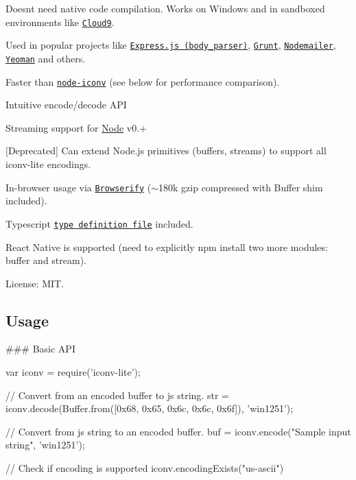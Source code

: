 
\begin{DoxyItemize}
\item Doesn\textquotesingle{}t need native code compilation. Works on Windows and in sandboxed environments like \href{http://c9.io}{\tt Cloud9}.
\item Used in popular projects like \href{https://github.com/expressjs/body-parser}{\tt Express.\+js (body\+\_\+parser)}, \href{http://gruntjs.com/}{\tt Grunt}, \href{http://www.nodemailer.com/}{\tt Nodemailer}, \href{http://yeoman.io/}{\tt Yeoman} and others.
\item Faster than \href{https://github.com/bnoordhuis/node-iconv}{\tt node-\/iconv} (see below for performance comparison).
\item Intuitive encode/decode A\+PI
\item Streaming support for \mbox{\hyperlink{classNode}{Node}} v0.+
\item \mbox{[}Deprecated\mbox{]} Can extend Node.\+js primitives (buffers, streams) to support all iconv-\/lite encodings.
\item In-\/browser usage via \href{https://github.com/substack/node-browserify}{\tt Browserify} ($\sim$180k gzip compressed with Buffer shim included).
\item Typescript \href{https://github.com/ashtuchkin/iconv-lite/blob/master/lib/index.d.ts}{\tt type definition file} included.
\item React Native is supported (need to explicitly {\ttfamily npm install} two more modules\+: {\ttfamily buffer} and {\ttfamily stream}).
\item License\+: M\+IT.
\end{DoxyItemize}

\href{https://npmjs.org/packages/iconv-lite/}{\tt }

\subsection*{Usage}

\#\#\# Basic A\+PI 
\begin{DoxyCode}
var iconv = require('iconv-lite');

// Convert from an encoded buffer to js string.
str = iconv.decode(Buffer.from([0x68, 0x65, 0x6c, 0x6c, 0x6f]), 'win1251');

// Convert from js string to an encoded buffer.
buf = iconv.encode("Sample input string", 'win1251');

// Check if encoding is supported
iconv.encodingExists("us-ascii")
\end{DoxyCode}


